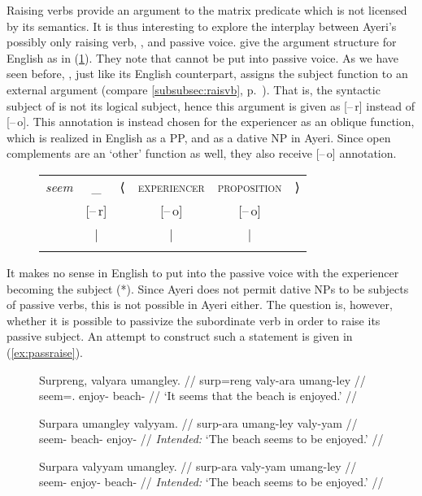 Raising verbs provide an argument to the matrix predicate which is not licensed
by its semantics. It is thus interesting to explore the interplay between
Ayeri's possibly only raising verb, , and passive
voice. \citet{bresnan2016} give the argument structure for English  as
in (\ref{ex:engseemastruct}). They note that  cannot be put into
passive voice. As we have seen before, , just like its
English counterpart, assigns the subject function to an external argument
(compare \autoref{subsubsec:raisvb}, p.~\pageref{subsubsec:raisvb}). That is,
the syntactic subject of  is not its logical subject, hence this
argument is given as [–\,r] instead of [–\,o]. This annotation is instead
chosen for the experiencer as an oblique function, which is realized in English
as a PP, and as a dative NP in Ayeri. Since open complements are an `other'
function as well, they also receive [–\,o] annotation.

\begin{figure}[h]
\ex\label{ex:engseemastruct}
\begin{tabular}[t]{@{} >{\itshape}l c l c c r}
seem
	& \_
	& ⟨
	& \textsc{experiencer}
	& \textsc{proposition}
	& ⟩
	\\
%
	& [–\,r]
	& %
	& [–\,o]
	& [–\,o]
	& %
	\\

%
	& |
	& %
	& |
	& |
	& %
	\\

%
	& \Subj
	& %
	& \Oblq{exp}
	& \XCompl
	& %
	\\
\end{tabular}

\xe
\end{figure}

It makes no sense in English to put  into the passive voice with the
experiencer becoming the subject (*). Since Ayeri does not
permit dative NPs to be subjects of passive verbs, this is not possible in
Ayeri either. The question is, however, whether it is possible to passivize the
subordinate verb in order to raise its passive subject. An attempt to construct
such a statement is given in (\ref{ex:passraise}).

\begin{figure}
\pex\label{ex:passraise}
\a\label{ex:passraise_1}\begingl
	\gla Surpreng, valyara umangley. //
	\glb surp=reng valy-ara umang-ley //
	\glc seem=\TsgI{}.\Aarg{} enjoy-\TsgI{} beach-\PargI{} //
	\glft `It seems that the beach is enjoyed.' //
\endgl

\a\label{ex:passraise_2}\ljudge*\begingl
	\gla Surpara umangley valyyam. //
	\glb surp-ara umang-ley valy-yam //
	\glc seem-\TsgI{} beach-\PargI{} enjoy-\Ptcp{} //
	\glft \textit{Intended:} `The beach seems to be enjoyed.' //
\endgl

\a\label{ex:passraise_3}\ljudge*\begingl
	\gla Surpara valyyam umangley. //
	\glb surp-ara valy-yam umang-ley //
	\glc seem-\TsgI{} enjoy-\Ptcp{} beach-\PargI{} //
	\glft \textit{Intended:} `The beach seems to be enjoyed.' //
\endgl
\xe
\end{figure}

